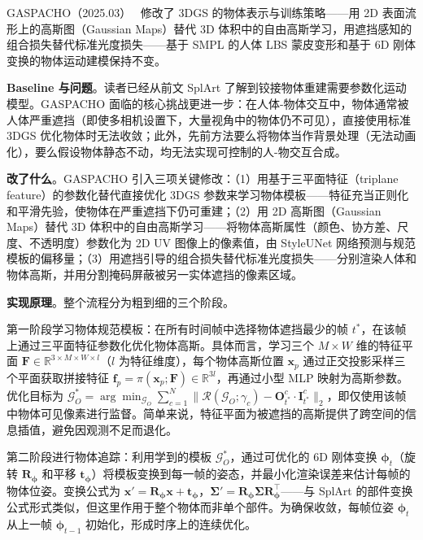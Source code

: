 GASPACHO（2025.03）~\cite{2503_09342} 修改了 3DGS 的物体表示与训练策略——用 2D 表面流形上的高斯图（Gaussian Maps）替代 3D 体积中的自由高斯学习，用遮挡感知的组合损失替代标准光度损失——基于 SMPL 的人体 LBS 蒙皮变形和基于 6D 刚体变换的物体运动建模保持不变。

\textbf{Baseline 与问题}。读者已经从前文 SplArt 了解到铰接物体重建需要参数化运动模型。GASPACHO 面临的核心挑战更进一步：在人体-物体交互中，物体通常被人体严重遮挡（即使多相机设置下，大量视角中的物体仍不可见），直接使用标准 3DGS 优化物体时无法收敛；此外，先前方法要么将物体当作背景处理（无法动画化），要么假设物体静态不动，均无法实现可控制的人-物交互合成。

\textbf{改了什么}。GASPACHO 引入三项关键修改：（1）用基于三平面特征（triplane feature）的参数化替代直接优化 3DGS 参数来学习物体模板——特征充当正则化和平滑先验，使物体在严重遮挡下仍可重建；（2）用 2D 高斯图（Gaussian Maps）替代 3D 体积中的自由高斯学习——将物体高斯属性（颜色、协方差、尺度、不透明度）参数化为 2D UV 图像上的像素值，由 StyleUNet 网络预测与规范模板的偏移量；（3）用遮挡引导的组合损失替代标准光度损失——分别渲染人体和物体高斯，并用分割掩码屏蔽被另一实体遮挡的像素区域。

\textbf{实现原理}。整个流程分为粗到细的三个阶段。

第一阶段学习物体规范模板：在所有时间帧中选择物体遮挡最少的帧 $t^*$，在该帧上通过三平面特征参数化优化物体高斯。具体而言，学习三个 $M \times W$ 维的特征平面 $\mathbf{F} \in \mathbb{R}^{3 \times M \times W \times l}$（$l$ 为特征维度），每个物体高斯位置 $\mathbf{x}_p$ 通过正交投影采样三个平面获取拼接特征 $\mathbf{f}_p = \pi(\mathbf{x}_p; \mathbf{F}) \in \mathbb{R}^{3l}$，再通过小型 MLP 映射为高斯参数。优化目标为 $\mathcal{G}_O^* = \arg\min_{\mathcal{G}_O} \sum_{c=1}^{N} \|\mathcal{R}(\mathcal{G}_O; \gamma_c) - \mathbf{O}_{t^*}^c \cdot \mathbf{I}_{t^*}^c\|_2$，即仅使用该帧中物体可见像素进行监督。简单来说，特征平面为被遮挡的高斯提供了跨空间的信息插值，避免因观测不足而退化。

第二阶段进行物体追踪：利用学到的模板 $\mathcal{G}_O^*$，通过可优化的 6D 刚体变换 $\boldsymbol{\phi}_t$（旋转 $\mathbf{R}_{\boldsymbol{\phi}}$ 和平移 $\mathbf{t}_{\boldsymbol{\phi}}$）将模板变换到每一帧的姿态，并最小化渲染误差来估计每帧的物体位姿。变换公式为 $\mathbf{x}' = \mathbf{R}_{\boldsymbol{\phi}} \mathbf{x} + \mathbf{t}_{\boldsymbol{\phi}}$，$\boldsymbol{\Sigma}' = \mathbf{R}_{\boldsymbol{\phi}} \boldsymbol{\Sigma} \mathbf{R}_{\boldsymbol{\phi}}^\top$——与 SplArt 的部件变换公式形式类似，但这里作用于整个物体而非单个部件。为确保收敛，每帧位姿 $\boldsymbol{\phi}_t$ 从上一帧 $\boldsymbol{\phi}_{t-1}$ 初始化，形成时序上的连续优化。

